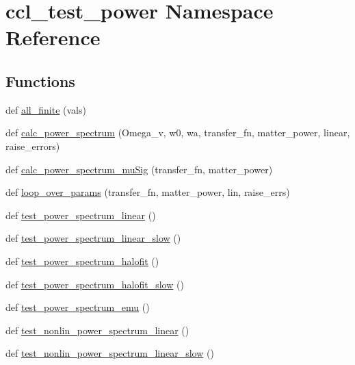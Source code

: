 \hypertarget{namespaceccl__test__power}{}\section{ccl\+\_\+test\+\_\+power Namespace Reference}
\label{namespaceccl__test__power}
\subsection*{Functions}
\begin{DoxyCompactItemize}
\item 
def \mbox{\hyperlink{namespaceccl__test__power_a3be01a8e90fe6de68e6f4560c2ea3e17}{all\+\_\+finite}} (vals)
\item 
def \mbox{\hyperlink{namespaceccl__test__power_a62e19844920cdba6f368f81b3ac3452a}{calc\+\_\+power\+\_\+spectrum}} (Omega\+\_\+v, w0, wa, transfer\+\_\+fn, matter\+\_\+power, linear, raise\+\_\+errors)
\item 
def \mbox{\hyperlink{namespaceccl__test__power_a8d91beaaf3981e2e40c68e159a0b5d4b}{calc\+\_\+power\+\_\+spectrum\+\_\+mu\+Sig}} (transfer\+\_\+fn, matter\+\_\+power)
\item 
def \mbox{\hyperlink{namespaceccl__test__power_a6a72c958a22a41eee6524ff79a2c68b1}{loop\+\_\+over\+\_\+params}} (transfer\+\_\+fn, matter\+\_\+power, lin, raise\+\_\+errs)
\item 
def \mbox{\hyperlink{namespaceccl__test__power_a2227cd6b570a8da2eb6e8246eeaa3a51}{test\+\_\+power\+\_\+spectrum\+\_\+linear}} ()
\item 
def \mbox{\hyperlink{namespaceccl__test__power_a92dc0303e3eecfbb9ceadb13d14cbb1c}{test\+\_\+power\+\_\+spectrum\+\_\+linear\+\_\+slow}} ()
\item 
def \mbox{\hyperlink{namespaceccl__test__power_a5715bce217f71fe9a7c7a41ac7525aac}{test\+\_\+power\+\_\+spectrum\+\_\+halofit}} ()
\item 
def \mbox{\hyperlink{namespaceccl__test__power_a0ab44977bf04c78a43252dcd7837c78d}{test\+\_\+power\+\_\+spectrum\+\_\+halofit\+\_\+slow}} ()
\item 
def \mbox{\hyperlink{namespaceccl__test__power_ac0f741beb7299903bb8a9262ce9d0d38}{test\+\_\+power\+\_\+spectrum\+\_\+emu}} ()
\item 
def \mbox{\hyperlink{namespaceccl__test__power_a0013a3039c9fcf8fb4ec6364be83a81b}{test\+\_\+nonlin\+\_\+power\+\_\+spectrum\+\_\+linear}} ()
\item 
def \mbox{\hyperlink{namespaceccl__test__power_a14141aede4702a292929dc31e09b5d81}{test\+\_\+nonlin\+\_\+power\+\_\+spectrum\+\_\+linear\+\_\+slow}} ()

\end{DoxyCompactItemize}
